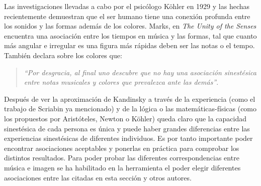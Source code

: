 Las investigaciones llevadas a cabo por el psicólogo Köhler en 1929 \cite{GestaltPsychology} y las hechas recientemente demuestran que el ser humano tiene una conexión profunda entre los sonidos y las formas además de los colores. Marks, en \emph{The Unity of the Senses} \cite{TheUnityOfTheSenses} encuentra una asociación entre los tiempos en música y las formas, tal que cuanto más angular e irregular es una figura más rápidas deben ser las notas o el tempo. También declara sobre los colores que:
\begin{quote}
\emph{``Por desgracia, al final uno descubre que no hay una asociación sinestésica entre notas musicales y colores que prevalezca ante las demás''}.\\
\end{quote}

Después de ver la aproximación de Kandinsky a través de la experiencia (como el trabajo de Scriabin ya mencionado) y de la lógica o las matemáticas-físicas (como los propuestos por Aristóteles, Newton o Köhler) queda claro que la capacidad sinestésica de cada persona es única y puede haber grandes diferencias entre las experiencias sinestésicas de diferentes individuos. Es por tanto importante poder encontrar asociaciones aceptables y ponerlas en práctica para comprobar los distintos resultados. Para poder probar las diferentes correspondencias entre música e imagen se ha habilitado en la herramienta el poder elegir diferentes asociaciones entre las citadas en esta sección y otros autores.